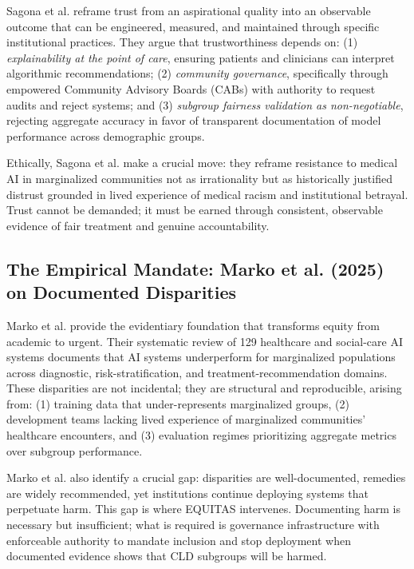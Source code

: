 \documentclass[12pt,a4paper]{article}
\begin{document}
Sagona et al. reframe trust from an aspirational quality into an observable outcome that can be engineered, measured, and maintained through specific institutional practices.\cite{sagona2025} They argue that trustworthiness depends on: (1) \textit{explainability at the point of care}, ensuring patients and clinicians can interpret algorithmic recommendations; (2) \textit{community governance}, specifically through empowered Community Advisory Boards (CABs) with authority to request audits and reject systems; and (3) \textit{subgroup fairness validation as non-negotiable}, rejecting aggregate accuracy in favor of transparent documentation of model performance across demographic groups.\cite{sagona2025}

Ethically, Sagona et al. make a crucial move: they reframe resistance to medical AI in marginalized communities not as irrationality but as historically justified distrust grounded in lived experience of medical racism and institutional betrayal.\cite{sagona2025} Trust cannot be demanded; it must be earned through consistent, observable evidence of fair treatment and genuine accountability.\cite{sagona2025}

\subsection{The Empirical Mandate: Marko et al. (2025) on Documented Disparities}

Marko et al. provide the evidentiary foundation that transforms equity from academic to urgent. Their systematic review of 129 healthcare and social-care AI systems documents that AI systems underperform for marginalized populations across diagnostic, risk-stratification, and treatment-recommendation domains.\cite{marko2025} These disparities are not incidental; they are structural and reproducible, arising from: (1) training data that under-represents marginalized groups, (2) development teams lacking lived experience of marginalized communities' healthcare encounters, and (3) evaluation regimes prioritizing aggregate metrics over subgroup performance.\cite{marko2025}

Marko et al. also identify a crucial gap: disparities are well-documented, remedies are widely recommended, yet institutions continue deploying systems that perpetuate harm.\cite{marko2025} This gap is where EQUITAS intervenes. Documenting harm is necessary but insufficient; what is required is governance infrastructure with enforceable authority to mandate inclusion and stop deployment when documented evidence shows that CLD subgroups will be harmed.
\end{document}
